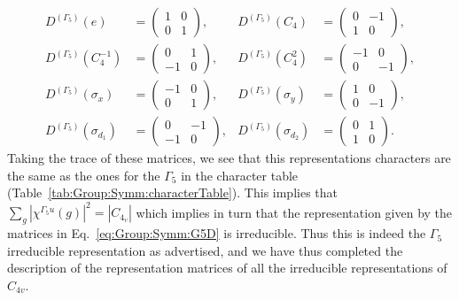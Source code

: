 \begin{subequations}
    \label{eq:Group:Symm:G5D}
\begin{align}
    D^{(\Gamma_5)}(e) &=
    \begin{pmatrix}
        1 & 0\\
        0 & 1
    \end{pmatrix}, & D^{(\Gamma_5)}(C_4) &=
    \begin{pmatrix}
        0 & -1\\
        1 & 0
    \end{pmatrix},\\
    D^{(\Gamma_5)}(C_4^{-1}) &=
    \begin{pmatrix}
        0 & 1\\
        -1 & 0
    \end{pmatrix}, & D^{(\Gamma_5)}(C_4^2) &= 
    \begin{pmatrix}
        -1 & 0\\
        0 & -1
    \end{pmatrix},\\
    D^{(\Gamma_5)}(\sigma_x) &= 
    \begin{pmatrix}
        -1 & 0\\
        0 & 1
    \end{pmatrix}, & D^{(\Gamma_5)}(\sigma_y) &=
    \begin{pmatrix}
        1 & 0\\
        0 & -1
    \end{pmatrix},\\
    D^{(\Gamma_5)}(\sigma_{d_1}) &=
    \begin{pmatrix}
        0 & -1\\
        -1 & 0
    \end{pmatrix}, & D^{(\Gamma_5)}(\sigma_{d_2}) &=
    \begin{pmatrix}
        0 & 1\\
        1 & 0
    \end{pmatrix}.
\end{align}
\end{subequations}
Taking the trace of these matrices, we see that this representations characters are the same as the ones for the \irr $\Gamma_5$ in the character table
(Table~\ref{tab:Group:Symm:characterTable}). This implies that $\sum_g|\chi^{\Gamma_5u}(g)|^2 = |C_{4_v}|$ which implies in turn that the representation
given by the matrices in Eq.~\eqref{eq:Group:Symm:G5D} is irreducible. Thus this is indeed the $\Gamma_5$ irreducible representation as advertised,
and we have thus completed the description of the representation matrices of all the irreducible representations of $C_{4v}$.


